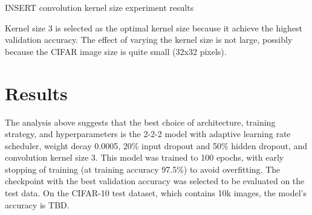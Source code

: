 \documentclass[letterpaper]{article} %
\begin{document}
INSERT convolution kernel size experiment results

Kernel size 3 is selected as the optimal kernel size because it achieve the highest validation accuracy.
The effect of varying the kernel size is not large, possibly because the CIFAR image size is quite small (32x32 pixels).

\section{Results}

The analysis above suggests that the best choice of architecture, training strategy, and hyperparameters is the 2-2-2
model with adaptive learning rate scheduler, weight decay 0.0005, 20\% input dropout and 50\% hidden dropout, and
convolution kernel size 3.
This model was trained to 100 epochs, with early stopping of training (at training accuracy 97.5\%) to avoid overfitting.
The checkpoint with the best validation accuracy was selected to be evaluated on the test data.
On the CIFAR-10 test dataset, which contains 10k images, the model's accuracy is TBD.


\end{document}
